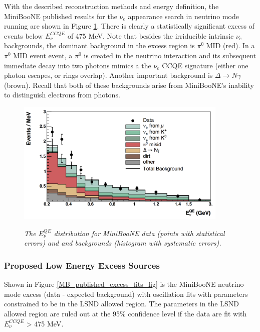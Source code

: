 With the described reconstruction methods and energy definition, the MiniBooNE published results \cite{MBLEEPaper} for the $\nu_e$ appearance search in neutrino mode running are shown in Figure \ref{MB_published_stackedhisto_fig}. There is clearly a statistically significant excess of events below $E_\nu^{CCQE}$ of 475 MeV. Note that besides the irriducible intrinsic $\nu_e$ backgrounds, the dominant background in the excess region is $\pi^0$ MID (red). In a $\pi^0$ MID event event, a $\pi^0$ is created in the neutrino interaction and its subsequent immediate decay into two photons mimics a the $\nu_e$ CCQE signature (either one photon escapes, or rings overlap). Another important background is $\Delta\rightarrow N\gamma$ (brown). Recall that both of these backgrounds arise from MiniBooNE's inability to distinguish electrons from photons.\\


\begin{figure}[ht!]
\centering
	\includegraphics[width=0.9\textwidth]{Figures/MB_published_stackedhisto.png} \\
\caption{\textit{The $E_\nu^{QE}$ distribution for MiniBooNE data (points with statistical errors) and and backgrounds (histogram with systematic errors).}}\label{MB_published_stackedhisto_fig}
\end{figure}

\subsubsection{Proposed Low Energy Excess Sources}
Shown in Figure \ref{MB_published_excess_fits_fig} is the MiniBooNE neutrino mode excess (data - expected background) with oscillation fits with parameters constrained to be in the LSND allowed region. The parameters in the LSND allowed region are ruled out at the 95\% confidence level if the data are fit with $E_\nu^{CCQE}$ > 475 MeV. \\

